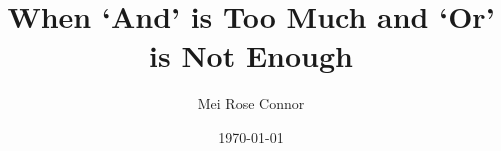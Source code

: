 \documentclass[12pt]{article}
\begin{document}
\title{When `And' is Too Much and `Or' is Not Enough}
\author{Mei Rose Connor}
\date{\today}

\maketitle
\end{document}
